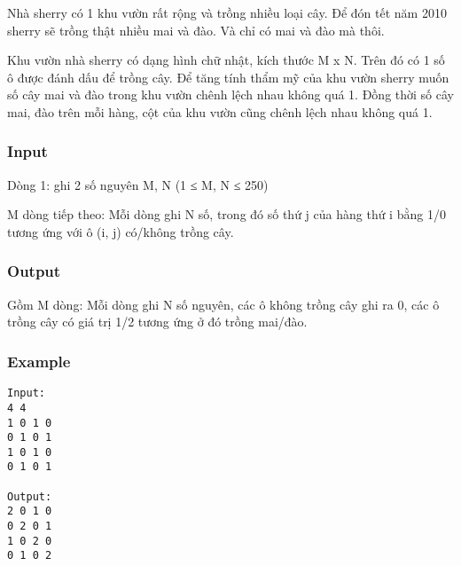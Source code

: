 



   Nhà sherry có 1 khu vườn rất rộng và trồng nhiều loại cây. Để đón tết năm 2010 sherry sẽ trồng thật nhiều mai và đào. Và chỉ có mai và đào mà thôi.  

   Khu vườn nhà sherry có dạng hình chữ nhật, kích thước M x N. Trên đó có 1 số ô được đánh dấu để trồng cây. Để tăng tính thẩm mỹ của khu vườn sherry muốn số cây mai và đào trong khu vườn chênh lệch nhau không quá 1. Đồng thời số cây mai, đào trên mỗi hàng, cột của khu vườn cũng chênh lệch nhau không quá 1.  

\subsubsection{   Input  }

   Dòng 1: ghi 2 số nguyên M, N (1 ≤ M, N ≤ 250)  

   M dòng tiếp theo: Mỗi dòng ghi N số, trong đó số thứ j của hàng thứ i bằng 1/0 tương ứng với ô (i, j) có/không trồng cây.  

\subsubsection{   Output  }

   Gồm M dòng: Mỗi dòng ghi N số nguyên, các ô không trồng cây ghi ra 0, các ô trồng cây có giá trị 1/2 tương ứng ở đó trồng mai/đào.  

\subsubsection{   Example  }
\begin{verbatim}
Input:
4 4
1 0 1 0
0 1 0 1
1 0 1 0
0 1 0 1

Output:
2 0 1 0
0 2 0 1
1 0 2 0
0 1 0 2

\end{verbatim}